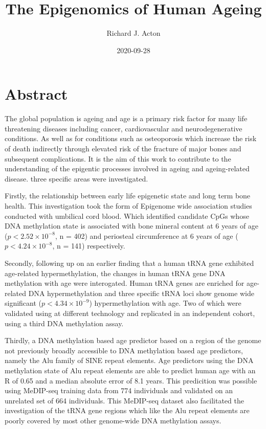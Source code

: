 \documentclass[
]{book}
\title{\textbf{The Epigenomics of Human Ageing}}
\subtitle{\emph{\emph{University of Southampton}}

\textbf{Academic Unit:} Human Development and Health

\textbf{Supervisors:} Chris Bell, Karen Lillycrop and Cyrus Cooper

Thesis for the degree of Doctor of Philosophy}
\author{Richard J. Acton}
\date{2020-09-28}
\begin{document}
\maketitle
\hypertarget{abstract}{%
\section*{Abstract}\label{abstract}}

The global population is ageing and age is a primary risk factor for many life threatening diseases including cancer, cardiovascular and neurodegenerative conditions.
As well as for conditions such as osteoporosis which increase the risk of death indirectly through elevated risk of the fracture of major bones and subsequent complications.
It is the aim of this work to contribute to the understanding of the epigentic processes involved in ageing and ageing-related disease.
three specific areas were investigated.

Firstly, the relationship between early life epigenetic state and long term bone health. This investigation took the form of Epigenome wide association studies conducted with umbilical cord blood.
Which identified candidate CpGs whose DNA methylation state is associated with bone mineral content at 6 years of age (\(p < 2.52\times 10^{-8}\), n = 402) and periosteal circumference at 6 years of age (\(p < 4.24\times 10^{-8}\), n = 141) respectively.

Secondly, following up on an earlier finding that a human tRNA gene exhibited age-related hypermethylation, the changes in human tRNA gene DNA methylation with age were interogated.
Human tRNA genes are enriched for age-related DNA hypermethylation and three specific tRNA loci show genome wide significant (\(p < 4.34\times10^{-9}\)) hypermethylation with age.
Two of which were validated using at different technology and replicated in an independent cohort, using a third DNA methylation assay.

Thirdly, a DNA methylation based age predictor based on a region of the genome not previously broadly accessible to DNA methylation based age predictors, namely the Alu family of SINE repeat elements.
Age predictors using the DNA methylation state of Alu repeat elements are able to predict human age with an R of 0.65 and a median absolute error of 8.1 years.
This predicition was possible using MeDIP-seq training data from 774 individuals and validated on an unrelated set of 664 individuals.
This MeDIP-seq dataset also facilitated the investigation of the tRNA gene regions which like the Alu repeat elements are poorly covered by most other genome-wide DNA methylation assays.
\end{document}

